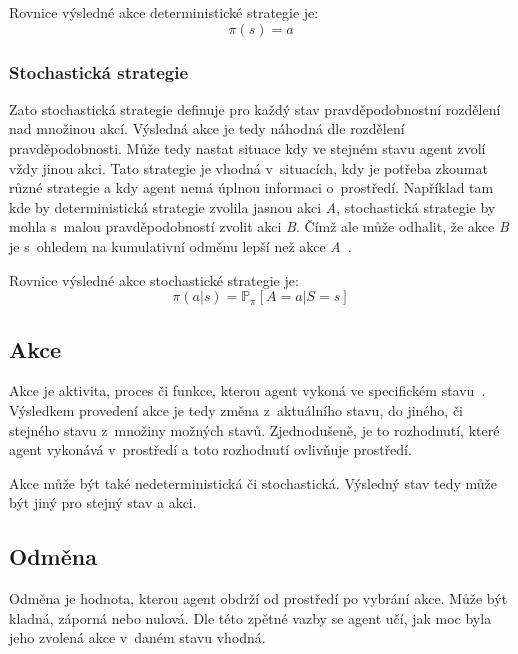   Rovnice výsledné akce deterministické strategie je:
  \begin{equation}
    \pi(s) = a\label{eq:policy_deterministic}
  \end{equation}

  \subsubsection*{Stochastická strategie}
  
  Zato stochastická strategie definuje pro každý stav pravděpodobnostní rozdělení nad množinou akcí.
  Výsledná akce je tedy náhodná dle rozdělení pravděpodobnosti.
  Může tedy nastat situace kdy ve stejném stavu agent zvolí vždy jinou akci.
  Tato strategie je vhodná v~situacích, kdy je potřeba zkoumat různé strategie a kdy agent nemá úplnou informaci o~prostředí.
  Například tam kde by deterministická strategie zvolila jasnou akci \textit{A}, stochastická strategie by mohla s~malou pravděpodobností zvolit akci \textit{B}.
  Čímž ale může odhalit, že akce \textit{B} je s~ohledem na kumulativní odměnu lepší než akce \textit{A}~\cite{Policies}.

  Rovnice výsledné akce stochastické strategie je:
  \begin{equation}
    \pi(a \vert s) = \mathbb{P}_\pi [A=a \vert S=s]\label{eq:policy_stochastic}
  \end{equation}

\subsection{Akce}\label{subsec:akce}

Akce je aktivita, proces či funkce, kterou agent vykoná ve specifickém stavu~\cite{ActionCo67}.
Výsledkem provedení akce je tedy změna z~aktuálního stavu, do jiného, či stejného stavu z~množiny možných stavů.
Zjednodušeně, je to rozhodnutí, které agent vykonává v~prostředí a toto rozhodnutí ovlivňuje prostředí.

Akce může být také nedeterministická či stochastická.
Výsledný stav tedy může být jiný pro stejný stav a akci.
  
\subsection{Odměna}\label{subsec:odmena}

  Odměna je hodnota, kterou agent obdrží od prostředí po vybrání akce.
  Může být kladná, záporná nebo nulová.
  Dle této zpětné vazby se agent učí, jak moc byla jeho zvolená akce v~daném stavu vhodná.

